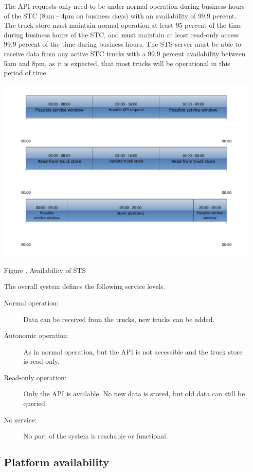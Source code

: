 \documentclass[a4paper,11pt]{report}
\newcommand{\mycaption}[1]{
  \addtocounter{figures}{1}
  Figure \arabic{figures}. #1
}
\begin{document}
The API requests only need to be under normal operation during 
business hours of the STC (8am - 4pm on business days) with an
availability of 99.9 percent. The truck store must maintain normal
operation at least 95 percent of the time during business hours
of the STC, and must maintain at least read-only access 99.9 percent
of the time during business hours. The STS server must be able to receive data
from any active STC trucks with a 99.9 percent availability between 5am and 8pm, as it is expected, that most trucks will be operational in this period of time. 

\begin{center}
  \includegraphics[width=1\textwidth]{figures/functional_availability}\\
  \mycaption{Availability of STS}
\end{center}

The overall system defines the following service levels.

\begin{description}
\item[Normal operation: ] Data can be received from the trucks, new
  trucks can be added.
\item[Autonomic operation: ] As in normal operation, but the API is
  not accessible and the truck store is read-only.
\item[Read-only operation: ] Only the API is available.  No new data
  is stored, but old data can still be queried.
\item[No service: ] No part of the system is reachable or functional.
\end{description}

\subsection{Platform availability}
\end{document}

